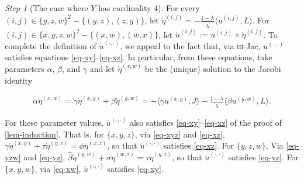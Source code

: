 \documentclass[ecta,nameyear,draft]{econsocart}
\makeatletter
\newcommand{\bs}{-}%
\newcommand\mpplus{\text{\srcsize$+\mkern-2mu+$}}
\newcommand{\mbbt}{{\mathbf {T}}}
\renewcommand{\ij}{{(i, j)}}
\newcommand{\xy}{{(x, y)}}
\newcommand{\yz}{{(y,z)}}
\newcommand{\xz}{{(x,z)}}
\newcommand{\xw}{{(x,w)}}
\newcommand{\yw}{{(y,w)}}
\newcommand{\zw}{(z,w)}
\newcommand{\wz}{(w,z)}
\newcommand{\dd}{{(\cdot,\cdot)}}
\newcommand{\threejac}{\textup{\textsc{iii}-Jac}}
\newcommand{\srcsize}{\@setfontsize{\srcsize}{3pt}{3pt}}
\theoremstyle{plain}
\theoremstyle{remark}
\newtheorem{step}{Step}[section]
\makeatother
\begin{document}
\begin{appendix}
\begin{step}[The case where $Y$ has cardinality $4$]


    For every $(i, j) \in \{y,z,w\}^2 \bs \{(y, z), (z, y)\}$, let
    $\acute{\eta}^{\ij} = - \frac{1 - \acute{\lambda}}{\acute{\lambda}} \langle
    u^{\ij}, L \rangle$.  For $(i, j) \in \{x, y , z, w\}^2 \bs \{(x, w), (w,
    x)\}$, let $\acute{u}^{\ij}:= u^{\ij} \times \acute{\eta}^{\ij}$.  To
    complete the definition of $\acute{u}^{\dd}$, we appeal to the fact that, via
    \threejac, $u^{\dd}$ satisfies equations \eqref{eq-xy}--\eqref{eq-xz}. In
    particular, from these equations, take parameters $\alpha$, $\beta$, and
    $\gamma$ and let $\acute{\eta}^{\xw}$ be the (unique) solution to the Jacobi
    identity
    \begin{linenomath*}
      \begin{equation}\label{eq-xw}
        \alpha \acute{\eta}^{\xw} = \gamma \acute{\eta}^{\xy} + \beta
        \acute{\eta}^{\yw} = -\langle \gamma u^{\xy} , J \rangle -
        \tfrac{1-\acute{\lambda}}{\acute{\lambda}}\langle\beta u^{\yw}, L
        \rangle.
      \end{equation}
    \end{linenomath*}
    For these parameter values, $\acute{u}^{\dd}$ also satisfies
    \eqref{eq-xy}--\eqref{eq-xz} of the proof of \cref{lem-induction}. That is,
    for $\{x,y,z\}$, via \cref{eq-xyz} and \eqref{eq-xz}, $\gamma
    \acute{\eta}^{\xy}+\tau \acute{\eta}^{\yz} = \phi \acute{\eta}^{\xz}$, so
    that $\acute{u}^{\dd}$ satisfies \eqref{eq-xz}. For $\{y,z,w\}$, Via
    \cref{eq-yzw} and \eqref{eq-yz}, $\hat{\beta} \acute{\eta}^{\yw}+\sigma
    \acute{\eta}^{\wz} = \tau \acute{\eta}^{\yz}$, so that $\acute{u}^{\dd}$
    satisfies \eqref{eq-yz}. For $\{x,y,w\}$, via \cref{eq-xw}, $\acute{u}^{\dd}$
    satisfies \eqref{eq-xy}.


\end{step}
\end{appendix}
\end{document}
